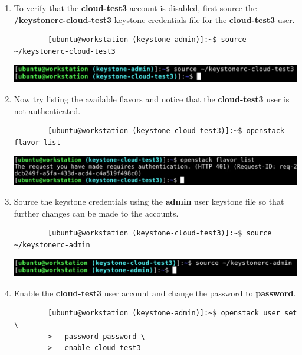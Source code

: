 \documentclass[letterpaper, 12pt]{article}
\begin{document}
\begin{enumerate}
    \item To verify that the \textbf{cloud-test3} account is disabled, first source the
    \textbf{\texttildemid/keystonerc-cloud-test3} keystone credentials file for the \textbf{cloud-test3} user.
    \begin{lstlisting}
        [ubuntu@workstation (keystone-admin)]:~$ source ~/keystonerc-cloud-test3
    \end{lstlisting}

    \begin{center}
        \includegraphics[width=\linewidth]{images/part4/step12.png}
    \end{center}

    \item Now try listing the available flavors and notice that the \textbf{cloud-test3} user is not authenticated.
    \begin{lstlisting}
        [ubuntu@workstation (keystone-cloud-test3)]:~$ openstack flavor list
    \end{lstlisting}

    \begin{center}
        \includegraphics[width=\linewidth]{images/part4/step13.png}
    \end{center}

    \item Source the keystone credentials using the \textbf{admin} user keystone file so that further changes can be
    made to the accounts.
    \begin{lstlisting}
        [ubuntu@workstation (keystone-cloud-test3)]:~$ source ~/keystonerc-admin
    \end{lstlisting}

    \begin{center}
        \includegraphics[width=\linewidth]{images/part4/step14.png}
    \end{center}

    \item Enable the \textbf{cloud-test3} user account and change the password to \textbf{password}.
    \begin{lstlisting}
        [ubuntu@workstation (keystone-admin)]:~$ openstack user set \
        > --password password \
        > --enable cloud-test3
    \end{lstlisting}


\end{enumerate}
\end{document}
